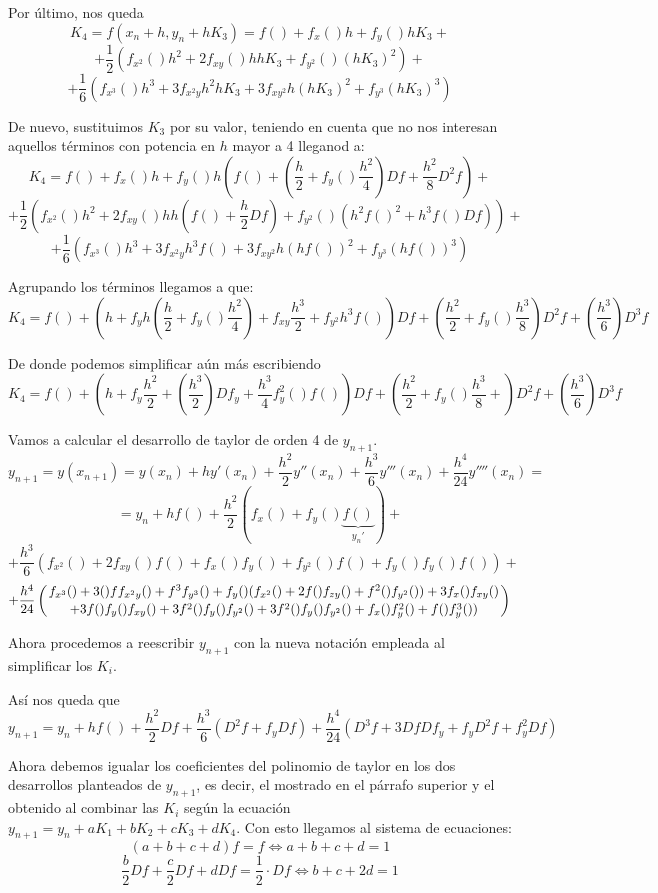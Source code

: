 \documentclass[nochap]{apuntes}
\begin{document}
Por último, nos queda
\[K_4 = f\left(x_n+h,y_n+hK_3\right)=f()+f_x()h+f_y()hK_3 +\]
\[+ \frac{1}{2}\left( f_{x^2}()h^2 +2 f_{xy}()hhK_3 +f_{y^2}()\left(hK_3\right)^2\right) +\]
\[+   \frac{1}{6}\left( f_{x^3}()h^3 + 3f_{x^2y}h^2hK_3 + 3f_{xy^2}h\left(hK_3\right)^2 + f_{y^3}\left(hK_3\right)^3\right)\]

De nuevo, sustituimos $K_3$ por su valor, teniendo en cuenta que no nos interesan aquellos términos con potencia en $h$ mayor a 4 lleganod a:
\[K_4 = f()+f_x()h+f_y()h\left( f()+\left(\frac{h}{2}+f_y()\frac{h^2}{4}\right)Df + \frac{h^2}{8}D^2f\right) +\]
\[+ \frac{1}{2}\left( f_{x^2}()h^2 +2 f_{xy}()hh\left(f()+\frac{h}{2}Df\right) +f_{y^2}()\left(h^2f()^2+h^3f()Df\right)\right) +\]
\[+   \frac{1}{6}\left( f_{x^3}()h^3 + 3f_{x^2y}h^3f() + 3f_{xy^2}h\left(hf()\right)^2 + f_{y^3}\left(hf()\right)^3\right)\]

Agrupando los términos llegamos a que:
\[K_4 = f() + \left(h +f_yh\left(\frac{h}{2}+f_y()\frac{h^2}{4} \right)+f_{xy}\frac{h^3}{2}+f_{y^2}h^3f()\right)Df + \left( \frac{h^2}{2} + f_y()\frac{h^3}{8}\right) D^2f + \left( \frac{h^3}{6}\right) D^3f\]

De donde podemos simplificar aún más escribiendo
\[K_4 = f() + \left(h +f_y\frac{h^2}{2}+\left(\frac{h^3}{2}\right)Df_y + \frac{h^3}{4}f_y^2()f()\right)Df + \left( \frac{h^2}{2} + f_y()\frac{h^3}{8}+\right) D^2f + \left( \frac{h^3}{6}\right) D^3f\]

Vamos a calcular el desarrollo de taylor de orden 4 de $y_{n+1}$.
\[y_{n+1} = y(x_{n+1}) = y(x_n) +h y'(x_n)+\frac{h^2}{2}y''(x_n)+\frac{h^3}{6}y'''(x_n) + \frac{h^4}{24}y''''(x_n)= \]
\[=  y_n + h f()+\frac{h^2}{2}\left(f_x()+f_y()\underbrace{f()}_{y_n'}\right)  + \]
\[+\frac{h^3}{6}\left(f_{x^2}()+2f_{xy}()f()+f_x()f_y()+f_{y^2}()f()+f_{y}()f_y()f() \right) +\]
\[ + \frac{h^4}{24} \left(f_{x^3}()+3()ff_{x^2y}()+f^3f_{y^3}()+f_y()(f_{x^2}()+2f()f_{zy}()+f^2()f_{y^2}())+3f_x()f_{xy}()\atop+3f()f_y()f_{xy}()+3f^2()f_y()f_{y^2}()+3f^2()f_y()f_{y^2}()+f_x()f_y^2()+f()f_y^3())\right)\]

Ahora procedemos a reescribir $y_{n+1}$ con la nueva notación empleada al simplificar los $K_i$.

Así nos queda que
\[y_{n+1}=y_n+hf() + \frac{h^2}{2}Df+\frac{h^3}{6}\left(D^2f+f_yDf\right) + \frac{h^4}{24}\left( D^3f+3DfDf_y+f_yD^2f+f_y^2Df\right)\]

Ahora debemos igualar los coeficientes del polinomio de taylor en los dos desarrollos planteados de $y_{n+1}$, es decir, el mostrado en el párrafo superior y el obtenido al combinar las $K_i$ según la ecuación $y_{n+1} = y_n + aK_1+bK_2+cK_3+dK_4$. Con esto llegamos al sistema de ecuaciones:
\small
\[
(a+b+c+d)f= f \iff a+b+c+d = 1 \]
\[\frac{b}{2}Df + \frac{c}{2}Df + dDf= \frac{1}{2}\cdot Df  \iff b+c+2d = 1\]
\end{document}
